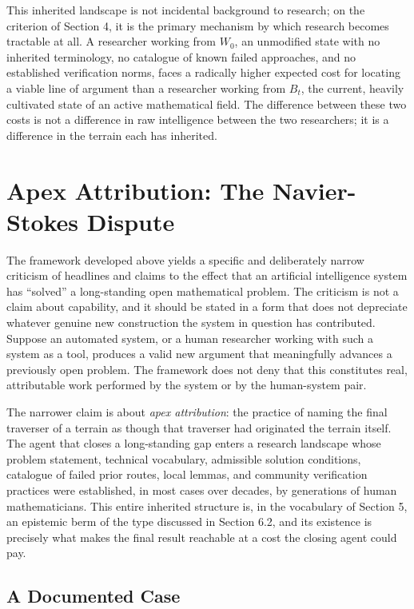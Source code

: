 \documentclass[11pt]{article}
\begin{document}
This inherited landscape is not incidental background to research; on the criterion of Section 4, it is the primary mechanism by which research becomes tractable at all. A researcher working from $W_0$, an unmodified state with no inherited terminology, no catalogue of known failed approaches, and no established verification norms, faces a radically higher expected cost for locating a viable line of argument than a researcher working from $B_t$, the current, heavily cultivated state of an active mathematical field. The difference between these two costs is not a difference in raw intelligence between the two researchers; it is a difference in the terrain each has inherited.

\section{Apex Attribution: The Navier-Stokes Dispute}

The framework developed above yields a specific and deliberately narrow criticism of headlines and claims to the effect that an artificial intelligence system has ``solved'' a long-standing open mathematical problem. The criticism is not a claim about capability, and it should be stated in a form that does not depreciate whatever genuine new construction the system in question has contributed. Suppose an automated system, or a human researcher working with such a system as a tool, produces a valid new argument that meaningfully advances a previously open problem. The framework does not deny that this constitutes real, attributable work performed by the system or by the human-system pair.

The narrower claim is about \emph{apex attribution}: the practice of naming the final traverser of a terrain as though that traverser had originated the terrain itself. The agent that closes a long-standing gap enters a research landscape whose problem statement, technical vocabulary, admissible solution conditions, catalogue of failed prior routes, local lemmas, and community verification practices were established, in most cases over decades, by generations of human mathematicians. This entire inherited structure is, in the vocabulary of Section 5, an epistemic berm of the type discussed in Section 6.2, and its existence is precisely what makes the final result reachable at a cost the closing agent could pay.

\subsection{A Documented Case}
\end{document}
